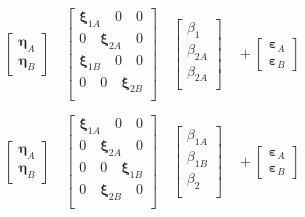 \begin{equation}
\label{nul2}
\left[\begin{array}{l}
\boldsymbol{\eta}_A \\
\boldsymbol{\eta}_B 
\end{array}\right] \quad
\left[\begin{array}{ccc}
\boldsymbol{\xi}_{1A}\quad 0 \quad0\\
0 \quad\boldsymbol{\xi}_{2A} \quad0\\
\boldsymbol{\xi}_{1B} \quad0 \quad0\\
0 \quad0 \quad\boldsymbol{\xi}_{2B}\\
\end{array}\right] \quad
\left[\begin{array}{l}
\beta_1 \\
\beta_{2A} \\
\beta_{2A} \\
\end{array}\right]  \quad +
\left[\begin{array}{l}
\boldsymbol{\varepsilon}_A \\
\boldsymbol{\varepsilon}_B 
\end{array}\right] 
\end{equation}

\begin{equation}
\label{nul22}
\left[\begin{array}{l}
\boldsymbol{\eta}_A \\
\boldsymbol{\eta}_B 
\end{array}\right] \quad
\left[\begin{array}{ccc}
\boldsymbol{\xi}_{1A}\quad 0 \quad0\\
0 \quad\boldsymbol{\xi}_{2A} \quad0\\
0 \quad0 \quad\boldsymbol{\xi}_{1B}\\
0 \quad\boldsymbol{\xi}_{2B} \quad0\\
\end{array}\right] \quad
\left[\begin{array}{l}
\beta_{1A} \\
\beta_{1B} \\
\beta_2 \\
\end{array}\right]  \quad +
\left[\begin{array}{l}
\boldsymbol{\varepsilon}_A \\
\boldsymbol{\varepsilon}_B 
\end{array}\right] 
\end{equation}

